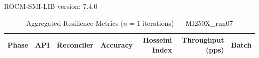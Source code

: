 ROCM-SMI-LIB version: 7.4.0

\begin{table}[htbp]
\caption{Aggregated Resilience Metrics ($n=1$ iterations) --- MI250X_run07}
\begin{tabular}{l l l r r r r}
\hline
Phase & API & Reconciler & Accuracy & Hosseini Index & Throughput (pps) & Batch \\
\hline
\hline
\end{tabular}
\end{table}
